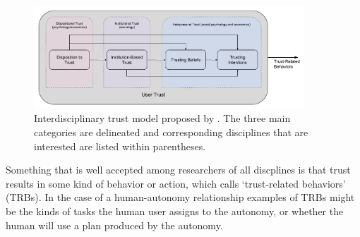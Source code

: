 	\begin{figure}[htbp]
    	\centering
     	\includegraphics[width=0.9\textwidth]{Figures/UserTrust}
    	\caption{Interdisciplinary trust model proposed by \citet{McKnight2001-fa}. The three main categories are delineated and corresponding disciplines that are interested are listed within parentheses.}
        \label{fig:UserTrust}
    \end{figure}

    Something that is well accepted among researchers of all discplines is that trust results in some kind of behavior or action, which \citet{McKnight2001-fa} calls `trust-related behaviors' (TRBs). In the case of a human-autonomy relationship examples of TRBs might be the kinds of tasks the human user assigns to the autonomy, or whether the human will use a plan produced by the autonomy.


